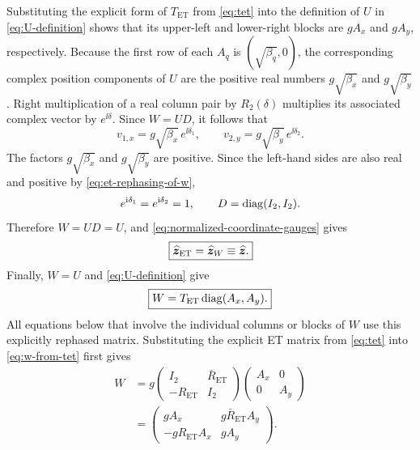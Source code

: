 Substituting the explicit form of $T_{\mathrm{ET}}$ from \cref{eq:tet} into
the definition of $U$ in \cref{eq:U-definition} shows that its upper-left and
lower-right blocks are $gA_x$ and $gA_y$, respectively.
Because the first row of each $A_q$ is $(\sqrt{\beta_q},0)$, the corresponding
complex position components of $U$ are the positive real numbers
$g\sqrt{\beta_x}$ and $g\sqrt{\beta_y}$.  Right multiplication of a real
column pair by $R_2(\delta)$ multiplies its associated complex vector by
$e^{\ii\delta}$.  Since $W=UD$, it follows that
\begin{equation}
 v_{1,x}=g\sqrt{\beta_x}\,e^{\ii\delta_1},
 \qquad
 v_{2,y}=g\sqrt{\beta_y}\,e^{\ii\delta_2}.
 \label{eq:principal-components-with-D}
\end{equation}
The factors $g\sqrt{\beta_x}$ and $g\sqrt{\beta_y}$ are positive.  Since the
left-hand sides are also real and positive by \cref{eq:et-rephasing-of-w},
\begin{equation}
 e^{\mathrm{i}\delta_1}=e^{\mathrm{i}\delta_2}=1,
 \qquad
 D=\operatorname{diag}(I_2,I_2).
 \label{eq:et-gauge-fixes-D}
\end{equation}
Therefore $W=UD=U$, and \cref{eq:normalized-coordinate-gauges} gives
\begin{equation}
 \boxed{
 \widehat{\bm{z}}_{\mathrm{ET}}=\widehat{\bm{z}}_W
 \equiv\widehat{\bm{z}}.
 }
 \label{eq:equal-normalized-coordinates}
\end{equation}
Finally, $W=U$ and \cref{eq:U-definition} give
\begin{equation}
 \boxed{
 W=T_{\mathrm{ET}}\operatorname{diag}(A_x,A_y).
 }
 \label{eq:w-from-tet}
\end{equation}
All equations below that involve the individual columns or blocks of $W$ use
this explicitly rephased matrix.
Substituting the explicit ET matrix from \cref{eq:tet} into
\cref{eq:w-from-tet} first gives
\begin{equation}
 \begin{aligned}
 W
 &=g
 \begin{pmatrix}
  I_2&\bar R_{\mathrm{ET}}\\
  -R_{\mathrm{ET}}&I_2
 \end{pmatrix}
 \begin{pmatrix}A_x&0\\0&A_y\end{pmatrix}\\
 &=\begin{pmatrix}
  g A_x&g\bar R_{\mathrm{ET}}A_y\\
  -g R_{\mathrm{ET}}A_x&g A_y
 \end{pmatrix}.
 \end{aligned}
 \label{eq:w-et-block-product}
\end{equation}
